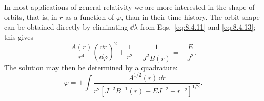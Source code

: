 In most applications of general relativity we are more interested in the
shape of orbits, that is, in \(r\) as a function of \(\varphi\), than in
their time history. The orbit shape can be obtained directly by eliminating
\(\dd\lambda\) from Eqs.~\eqref{eq:8.4.11} and \eqref{eq:8.4.13}; this
gives
\begin{equation}
  \frac{A(r)}{r^4}
  \left(\frac{\dd r}{\dd\varphi}\right)^2
  +\frac{1}{r^2}
  -\frac{1}{J^2B(r)}
  =-\frac{E}{J^2}.
  \tag{8.4.29}\label{eq:8.4.29}
\end{equation}
The solution may then be determined by a quadrature:
\begin{equation}
  \varphi
  =
  \pm\int
  \frac{A^{1/2}(r)\,\dd r}
  {r^2\left[J^{-2}B^{-1}(r)-EJ^{-2}-r^{-2}\right]^{1/2}}.
  \tag{8.4.30}\label{eq:8.4.30}
\end{equation}
